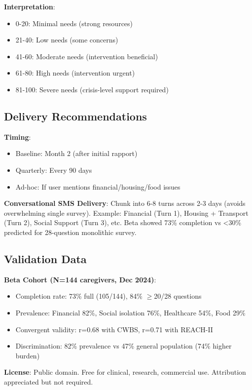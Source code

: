 \documentclass{article}%
\begin{document}
\textbf{Interpretation}:
\begin{itemize}
    \item 0-20: Minimal needs (strong resources)
    \item 21-40: Low needs (some concerns)
    \item 41-60: Moderate needs (intervention beneficial)
    \item 61-80: High needs (intervention urgent)
    \item 81-100: Severe needs (crisis-level support required)
\end{itemize}

\subsection*{Delivery Recommendations}

\textbf{Timing}:
\begin{itemize}
    \item Baseline: Month 2 (after initial rapport)
    \item Quarterly: Every 90 days
    \item Ad-hoc: If user mentions financial/housing/food issues
\end{itemize}

\textbf{Conversational SMS Delivery}: Chunk into 6-8 turns across 2-3 days (avoids overwhelming single survey). Example: Financial (Turn 1), Housing + Transport (Turn 2), Social Support (Turn 3), etc. Beta showed 73\% completion vs <30\% predicted for 28-question monolithic survey.

\subsection*{Validation Data}

\textbf{Beta Cohort (N=144 caregivers, Dec 2024)}:
\begin{itemize}
    \item Completion rate: 73\% full (105/144), 84\% $\geq$20/28 questions
    \item Prevalence: Financial 82\%, Social isolation 76\%, Healthcare 54\%, Food 29\%
    \item Convergent validity: r=0.68 with CWBS, r=0.71 with REACH-II
    \item Discrimination: 82\% prevalence vs 47\% general population (74\% higher burden)
\end{itemize}

\textbf{License}: Public domain. Free for clinical, research, commercial use. Attribution appreciated but not required.
\end{document}
